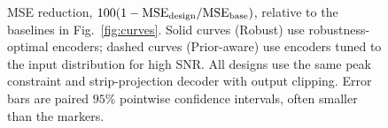 \begin{figure}[!t]
{
}
 \caption{{\color{black} MSE reduction, $100(1-\mathrm{MSE}_{\rm design}/\mathrm{MSE}_{\rm base})$, relative to the baselines in Fig.~\ref{fig:curves}. Solid curves (Robust) use robustness-optimal encoders; dashed curves (Prior-aware) use encoders tuned to the input distribution for high SNR. All designs use the same peak constraint and strip-projection decoder with output clipping. Error bars are paired $95\%$ pointwise confidence intervals, often smaller than the markers.}}
 \label{fig:finite-noise}
\end{figure}
